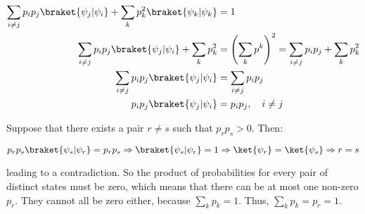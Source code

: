 \begin{align}
\sum_{i \ne j}{p_i p_j \braket{\psi_j|\psi_i}} + \sum_k{p_k^2
\braket{\psi_k|\psi_k}} &= 1 \\
\sum_{i \ne j}{p_i p_j \braket{\psi_j|\psi_i}} + \sum_k{p_k^2} &= \left(
\sum_k{p^k} \right)^2 = \sum_{i \ne j}{p_i p_j} + \sum_k{p_k^2} \\
\sum_{i \ne j}{p_i p_j \braket{\psi_j|\psi_i}} &= \sum_{i \ne j}{p_i p_j} \\
p_i p_j \braket{\psi_j|\psi_i} &= p_i p_j, \quad i \ne j
\end{align}

Suppose that there exists a pair $r \ne s$ such that $p_r p_s > 0$. Then:

$$
p_r p_s \braket{\psi_s|\psi_r} = p_r p_s \Rightarrow \braket{\psi_s|\psi_r} = 1
\Rightarrow \ket{\psi_r} = \ket{\psi_s} \Rightarrow r = s
$$

leading to a contradiction. So the product of probabilities for every pair of
distinct states must be zero, which means that there can be at most one non-zero
$p_r$.  They cannot all be zero either, because $\sum_k{p_k} = 1$. Thus,
$\sum_k{p_k} = p_r = 1$.

